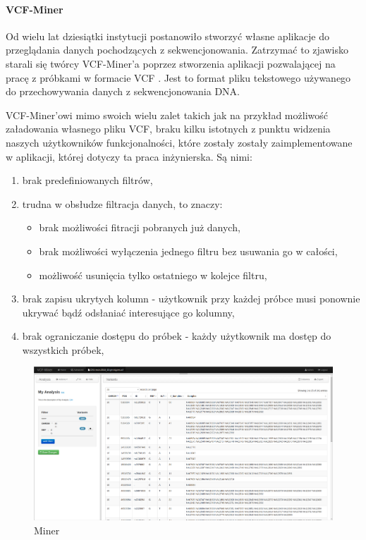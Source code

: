 \documentclass[a4paper,12pt,twoside]{article}
\begin{document}
\newpage

\paragraph{VCF-Miner}

Od wielu lat dziesiątki instytucji postanowiło stworzyć własne aplikacje do przeglądania danych pochodzących z sekwencjonowania. Zatrzymać to zjawisko
starali się twórcy VCF-Miner'a \cite{miner} \cite{minerArt} poprzez 
stworzenia aplikacji pozwalającej na pracę z próbkami w formacie VCF \cite{vcfformat}. Jest to format pliku tekstowego używanego do przechowywania
danych z sekwencjonowania DNA. 

VCF-Miner'owi mimo swoich wielu zalet takich jak na przykład możliwość
załadowania własnego pliku VCF, braku kilku istotnych z 
punktu widzenia naszych użytkowników funkcjonalności, które zostały 
zostały zaimplementowane w aplikacji, której dotyczy ta praca inżynierska.
Są nimi:
\begin{enumerate}[1)]
\item brak predefiniowanych filtrów, 
\item trudna w obsłudze filtracja danych, to znaczy: 
\begin{itemize}
\item brak możliwości fitracji pobranych już danych,   
\item brak możliwości wyłączenia jednego filtru bez usuwania go w całości,
\item możliwość usunięcia tylko ostatniego w kolejce filtru,
\end{itemize}
\item brak zapisu ukrytych kolumn - użytkownik przy każdej próbce
musi ponownie ukrywać bądź odsłaniać interesujące go kolumny,
\item brak ograniczanie dostępu do próbek - każdy użytkownik ma dostęp
do wszystkich próbek,
\end{enumerate}

\begin{figure}[h]
\includegraphics[width=\linewidth]{obrazy/exac/miner.png}
  \caption{Miner}
  \label{fig:minerpic}
\end{figure}
\end{document}

